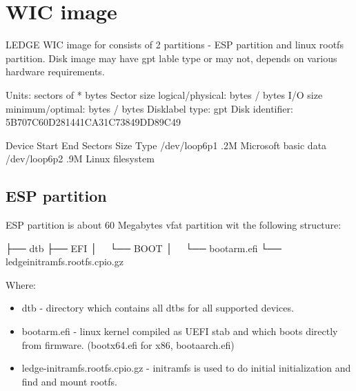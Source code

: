 \documentclass[a4paper,10pt,oneside,english]{sphinxmanual}
\begin{document}
\section{WIC image}
\label{\detokenize{chapter4-internals:wic-image}}
LEDGE WIC image for consists of 2 partitions - ESP partition and linux rootfs partition. Disk image may have
gpt lable type or may not, depends on various hardware requirements.

\begin{sphinxVerbatim}[commandchars=\\\{\}]
Units: sectors of  *    bytes
Sector size logical/physical:  bytes /  bytes
I/O size minimum/optimal:  bytes /  bytes
Disklabel type: gpt
Disk identifier: 5B707C60\PYGZhy{}D281\PYGZhy{}441C\PYGZhy{}A31C\PYGZhy{}73849DD89C49

Device        Start     End Sectors   Size Type
/dev/loop6p1           .2M Microsoft basic data
/dev/loop6p2    .9M Linux filesystem
\end{sphinxVerbatim}


\subsection{ESP partition}
\label{\detokenize{chapter4-internals:esp-partition}}
ESP partition is about 60 Megabytes vfat partition wit the following structure:

\begin{sphinxVerbatim}[commandchars=\\\{\}]
├── dtb
├── EFI
│   └── BOOT
│       └── bootarm.efi
└── ledge\PYGZhy{}initramfs.rootfs.cpio.gz
\end{sphinxVerbatim}

Where:
\begin{itemize}
\item {} 
dtb - directory which contains all dtbs for all supported devices.

\item {} 
bootarm.efi - linux kernel compiled as UEFI stab and which boots directly from firmware. (bootx64.efi for x86, bootaarch.efi)

\item {} 
ledge-initramfs.rootfs.cpio.gz - initramfs is used to do initial initialization and find and mount rootfs.

\end{itemize}
\end{document}
